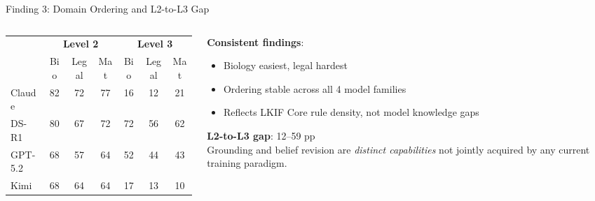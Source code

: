 \documentclass[aspectratio=169]{beamer}
\begin{document}
\begin{frame}{Finding 3: Domain Ordering and L2-to-L3 Gap}

\begin{columns}[T]
\begin{column}{0.55\textwidth}
\small
\begin{tabular}{@{}lcccccc@{}}
\toprule
 & \multicolumn{3}{c}{\textbf{Level 2}} & \multicolumn{3}{c}{\textbf{Level 3}} \\
\cmidrule(lr){2-4}\cmidrule(lr){5-7}
 & Bio & Legal & Mat & Bio & Legal & Mat \\
\midrule
Claude   & 82 & 72 & 77 & 16 & 12 & 21 \\
DS-R1    & 80 & 67 & 72 & 72 & 56 & 62 \\
GPT-5.2  & 68 & 57 & 64 & 52 & 44 & 43 \\
Kimi     & 68 & 64 & 64 & 17 & 13 & 10 \\
\bottomrule
\end{tabular}
\end{column}
\begin{column}{0.42\textwidth}
\textbf{Consistent findings}:
\begin{itemize}
    \item Biology easiest, legal hardest
    \item Ordering stable across all 4 model families
    \item Reflects LKIF Core rule density, not model knowledge gaps
\end{itemize}

\vspace{0.5em}
\textbf{L2-to-L3 gap}: 12--59 pp\\[4pt]
Grounding and belief revision are \textit{distinct capabilities} not jointly acquired by any current training paradigm.
\end{column}
\end{columns}
\end{frame}
\end{document}
